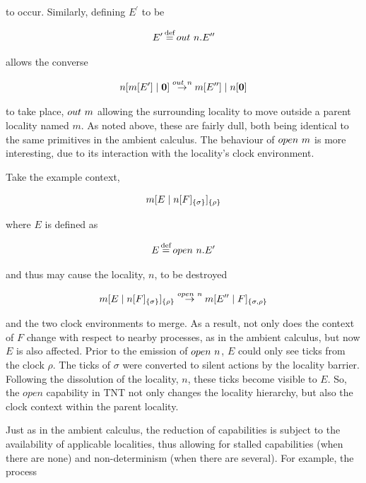 \noindent to occur.  Similarly, defining $E^\prime$ to be

\begin{equation}
E^\prime \operatorname{\stackrel{\textrm{def}}{=}} out\ n.E^{\prime\prime}
\end{equation}

\noindent allows the converse

\begin{equation}
{n}[ {m}[ E^\prime ]\;|\;\textbf{0} ] \stackrel{out\ n}{\rightarrow}
{m}[ E^{\prime\prime} ]\;|\;{n}[ \textbf{0} ]
\end{equation}

\noindent to take place, $out\ m$ allowing the surrounding locality
to move outside a parent locality named $m$.  As noted above, these are
fairly dull, both being identical to the same primitives in the ambient
calculus.  The behaviour of $open\ m$ is more interesting, due to
its interaction with the locality's clock environment.

Take the example context,

\begin{equation}
{m}[ E\;|\;{n}[ F ]_{\{\sigma\}} ]_{\{\rho\}}
\end{equation}

\noindent where $E$ is defined as

\begin{equation}
E \operatorname{\stackrel{\textrm{def}}{=}} open\ n.E^\prime
\end{equation}

\noindent and thus may cause the locality, $n$, to be destroyed

\begin{equation}
{m}[ E\;|\;{n}[ F ]_{\{\sigma\}} ]_{\{\rho\}} \stackrel{open\ n}{\rightarrow}
{m}[ E'^\prime\;|\;F ]_{\{\sigma, \rho\}}
\end{equation}

\noindent and the two clock environments to merge.  As a result, not
only does the context of $F$ change with respect to nearby processes, as
in the ambient calculus, but now $E$ is also affected.  Prior to the
emission of $open\ n$, $E$ could only see ticks from the clock
$\rho$.  The ticks of $\sigma$ were converted to silent actions by the
locality barrier.  Following the dissolution of the locality, $n$, these
ticks become visible to $E$.  So, the $open$ capability in TNT not only
changes the locality hierarchy, but also the clock context within the
parent locality.

Just as in the ambient calculus, the reduction of capabilities is
subject to the availability of applicable localities, thus allowing for
stalled capabilities (when there are none) and non-determinism (when
there are several). For example, the process

